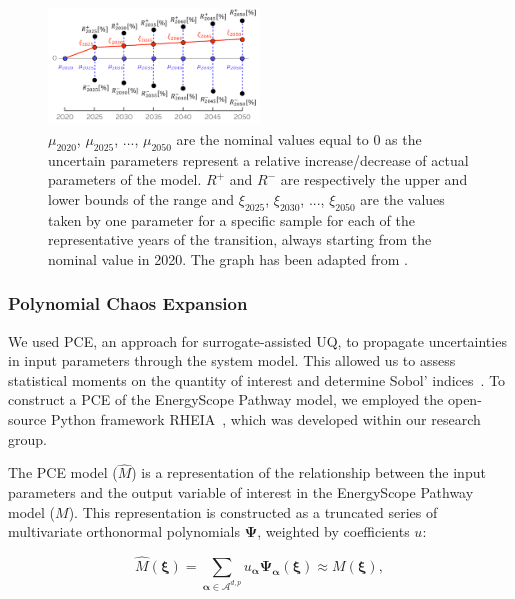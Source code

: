 \documentclass[11pt,twoside,a4paper,english]{article}
\begin{document}
\begin{figure}[!htbp]
\centering
\includegraphics[width=0.5\textwidth]{figures/ranges_transition.pdf}
\caption{$\mu_{2020}$, $\mu_{2025}$, ...,  $\mu_{2050}$ are the nominal values equal to 0 as the uncertain parameters represent a relative increase/decrease of actual parameters of the model. $R^+$ and $R^-$ are respectively the upper and lower bounds of the range and $\xi_{2025}$, $\xi_{2030}$, ...,  $\xi_{2050}$ are the values taken by one parameter for a specific sample for each of the representative years of the transition, always starting from the nominal value in 2020. The graph has been adapted from \cite{guevara2022modeling}.}
\label{fig:ranges_transition}
\end{figure}

\subsubsection{Polynomial Chaos Expansion}
\label{subsubsec:UQ:PCE}

We used \gls{PCE}, an approach for surrogate-assisted \gls{UQ}, to propagate uncertainties in input parameters through the system model. This allowed us to assess statistical moments on the quantity of interest and determine Sobol' indices~\cite{coppitters2020robust}. To construct a PCE of the EnergyScope Pathway model, we employed the open-source Python framework RHEIA~\cite{coppitters2022rheia}, which was developed within our research group.\par

The PCE model ($\hat{M}$) is a representation of the relationship between the input parameters and the output variable of interest in the EnergyScope Pathway model ($M$). This representation is constructed as a truncated series of multivariate orthonormal polynomials $\bm{\Psi}$, weighted by coefficients $u$:

\begin{equation}
\hat{M} \left( \bm{\xi} \right) = \sum_{\bm{\alpha} \in \mathcal{A}^{d,p}} u_{\bm{\alpha}} \bm{\Psi}_{\bm{\alpha}} \left( \bm{\xi} \right) \approx M \left( \bm{\xi} \right), 
\end{equation}
\end{document}
